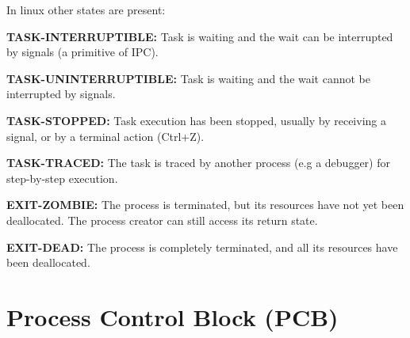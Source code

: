     In linux other states are present:
    \begin{compactitemize}
        \item \textbf{TASK-INTERRUPTIBLE:} Task is waiting and the wait can be interrupted by signals (a primitive of IPC).
        \item \textbf{TASK-UNINTERRUPTIBLE:} Task is waiting and the wait cannot be interrupted by signals.
        \item \textbf{TASK-STOPPED:} Task execution has been stopped, usually by receiving a signal, or by a terminal action (Ctrl+Z).
        \item \textbf{TASK-TRACED:} The task is traced by another process (e.g a debugger) for step-by-step execution.
        \item \textbf{EXIT-ZOMBIE:} The process is terminated, but its resources have not yet been deallocated. The process creator can still access its return state.
        \item \textbf{EXIT-DEAD:} The process is completely terminated, and all its resources have been deallocated.
    \end{compactitemize}


\section{Process Control Block (PCB)}

